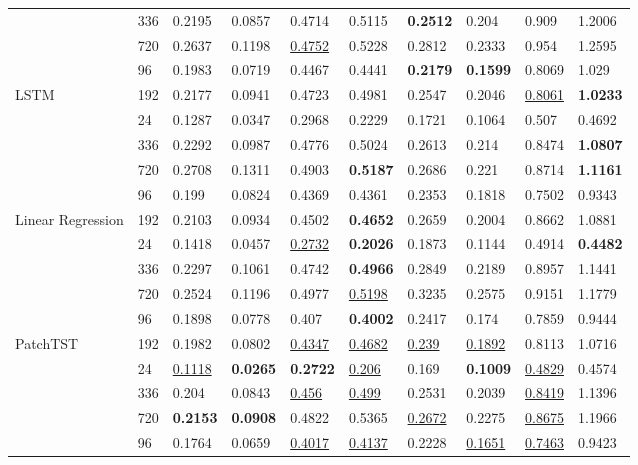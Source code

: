 \begin{tabular}{llllllllll}
 & 336 & 0.2195 & 0.0857 & 0.4714 & 0.5115 & \textbf{0.2512} & 0.204 & 0.909 & 1.2006 \\
 & 720 & 0.2637 & 0.1198 & \underline{0.4752} & 0.5228 & 0.2812 & 0.2333 & 0.954 & 1.2595 \\
 & 96 & 0.1983 & 0.0719 & 0.4467 & 0.4441 & \textbf{0.2179} & \textbf{0.1599} & 0.8069 & 1.029 \\
\cline{1-10}
\multirow[t]{5}{*}{LSTM} & 192 & 0.2177 & 0.0941 & 0.4723 & 0.4981 & 0.2547 & 0.2046 & \underline{0.8061} & \textbf{1.0233} \\
 & 24 & 0.1287 & 0.0347 & 0.2968 & 0.2229 & 0.1721 & 0.1064 & 0.507 & 0.4692 \\
 & 336 & 0.2292 & 0.0987 & 0.4776 & 0.5024 & 0.2613 & 0.214 & 0.8474 & \textbf{1.0807} \\
 & 720 & 0.2708 & 0.1311 & 0.4903 & \textbf{0.5187} & 0.2686 & 0.221 & 0.8714 & \textbf{1.1161} \\
 & 96 & 0.199 & 0.0824 & 0.4369 & 0.4361 & 0.2353 & 0.1818 & 0.7502 & 0.9343 \\
\cline{1-10}
\multirow[t]{5}{*}{Linear Regression} & 192 & 0.2103 & 0.0934 & 0.4502 & \textbf{0.4652} & 0.2659 & 0.2004 & 0.8662 & 1.0881 \\
 & 24 & 0.1418 & 0.0457 & \underline{0.2732} & \textbf{0.2026} & 0.1873 & 0.1144 & 0.4914 & \textbf{0.4482} \\
 & 336 & 0.2297 & 0.1061 & 0.4742 & \textbf{0.4966} & 0.2849 & 0.2189 & 0.8957 & 1.1441 \\
 & 720 & 0.2524 & 0.1196 & 0.4977 & \underline{0.5198} & 0.3235 & 0.2575 & 0.9151 & 1.1779 \\
 & 96 & 0.1898 & 0.0778 & 0.407 & \textbf{0.4002} & 0.2417 & 0.174 & 0.7859 & 0.9444 \\
\cline{1-10}
\multirow[t]{5}{*}{PatchTST} & 192 & 0.1982 & 0.0802 & \underline{0.4347} & \underline{0.4682} & \underline{0.239} & \underline{0.1892} & 0.8113 & 1.0716 \\
 & 24 & \underline{0.1118} & \textbf{0.0265} & \textbf{0.2722} & \underline{0.206} & 0.169 & \textbf{0.1009} & \underline{0.4829} & 0.4574 \\
 & 336 & 0.204 & 0.0843 & \underline{0.456} & \underline{0.499} & 0.2531 & 0.2039 & \underline{0.8419} & 1.1396 \\
 & 720 & \textbf{0.2153} & \textbf{0.0908} & 0.4822 & 0.5365 & \underline{0.2672} & 0.2275 & \underline{0.8675} & 1.1966 \\
 & 96 & 0.1764 & 0.0659 & \underline{0.4017} & \underline{0.4137} & 0.2228 & \underline{0.1651} & \underline{0.7463} & 0.9423 \\

\end{tabular}
